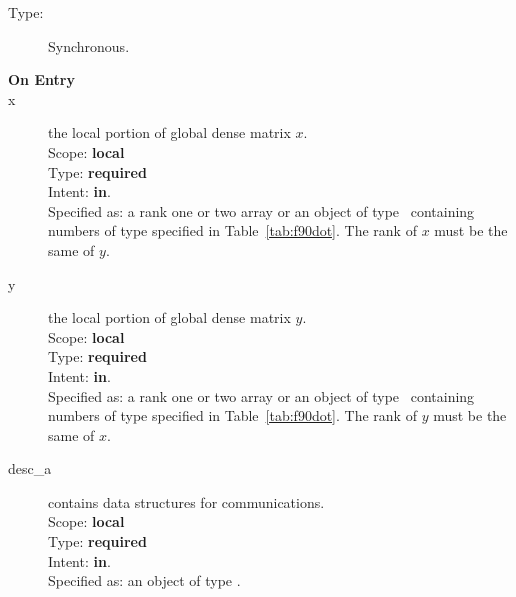 \begin{description}
\item[Type:] Synchronous.
\item[\bf On Entry]
\item[x] the local portion of global dense matrix
$x$.\\
Scope: {\bf local} \\
Type: {\bf required} \\
Intent: {\bf in}.\\
Specified as:  a rank one or two array or an object of type \vdata\ 
containing numbers of type specified in
Table~\ref{tab:f90dot}. The rank of $x$ must be the same of $y$. 
\item[y] the local portion of global dense matrix
$y$. \\
Scope: {\bf local} \\
Type: {\bf required} \\
Intent: {\bf in}.\\
Specified as:  a rank one or two array or an object of type \vdata\ 
containing numbers of type specified in
Table~\ref{tab:f90dot}. The rank of $y$ must be the same of $x$. 
\item[desc\_a] contains data structures for communications.\\
Scope: {\bf local} \\
Type: {\bf required}\\
Intent: {\bf in}.\\
Specified as: an object of type \descdata.


\end{description}
